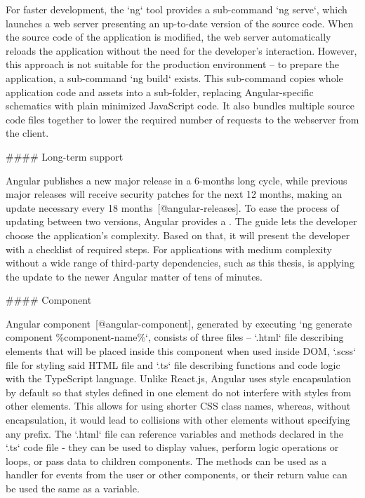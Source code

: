 \documentclass[
  digital, %
  oneside, %
  lof,     %
  nolot,     %
]{fithesis4}
\begin{document}
For faster development, the `ng` tool provides a sub-command `ng serve`, which launches a web server presenting an up-to-date version of the source code. When the source code of the application is modified, the web server automatically reloads the application without the need for the developer's interaction. However, this approach is not suitable for the production environment -- to prepare the application, a sub-command `ng build` exists. This sub-command copies whole application code and assets into a sub-folder, replacing Angular-specific schematics with plain minimized JavaScript code. It also bundles multiple source code files together to lower the required number of requests to the webserver from the client.

#### Long-term support

Angular publishes a new major release in a 6-months long cycle, while previous major releases will receive security patches for the next 12 months, making an update necessary every 18 months~[@angular-releases]. To ease the process of updating between two versions, Angular provides a . The guide lets the developer choose the application's complexity. Based on that, it will present the developer with a checklist of required steps. For applications with medium complexity without a wide range of third-party dependencies, such as this thesis, is applying the update to the newer Angular matter of tens of minutes.

#### Component

Angular component~[@angular-component], generated by executing `ng generate component \%component-name\%`, consists of three files -- `.html` file describing elements that will be placed inside this component when used inside DOM, `.scss` file for styling said HTML file and `.ts` file describing functions and code logic with the TypeScript language. Unlike React.js, Angular uses style encapsulation by default so that styles defined in one element do not interfere with styles from other elements. This allows for using shorter CSS class names, whereas, without encapsulation, it would lead to collisions with other elements without specifying any prefix. The `.html` file can reference variables and methods declared in the `.ts` code file - they can be used to display values, perform logic operations or loops, or pass data to children components. The methods can be used as a handler for events from the user or other components, or their return value can be used the same as a variable.
\end{document}

